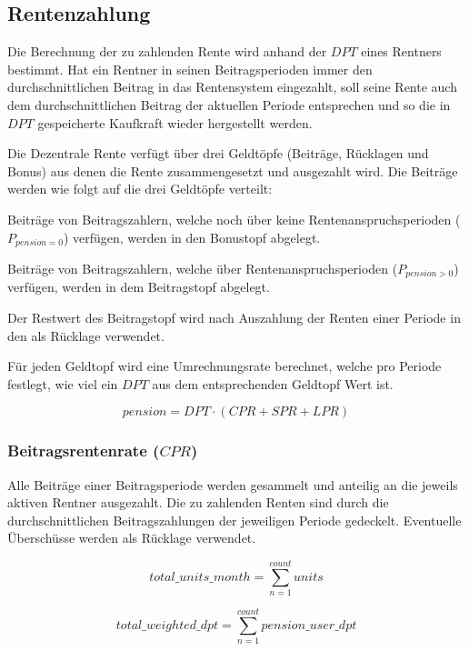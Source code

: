 \subsection{Rentenzahlung}
Die Berechnung der zu zahlenden Rente wird anhand der $DPT$ eines Rentners bestimmt.
Hat ein
Rentner in seinen Beitragsperioden immer den durchschnittlichen Beitrag in das
Rentensystem eingezahlt, soll seine
Rente auch dem durchschnittlichen Beitrag der aktuellen
Periode entsprechen und so die in $DPT$ gespeicherte Kaufkraft wieder hergestellt werden.


Die Dezentrale Rente verfügt über drei Geldtöpfe (Beiträge, Rücklagen und Bonus) 
aus denen die Rente zusammengesetzt und ausgezahlt wird. Die Beiträge werden wie folgt auf 
die drei Geldtöpfe verteilt:
\begin{compactenum}
\item Beiträge von Beitragszahlern, welche noch über keine Rentenanspruchsperioden ($P_{pension = 0}$) verfügen, werden in den Bonustopf abgelegt.
\item Beiträge von Beitragszahlern, welche über Rentenanspruchsperioden ($P_{pension > 0}$) verfügen, werden in dem Beitragstopf abgelegt.
\item Der Restwert des Beitragstopf wird nach Auszahlung der Renten einer Periode in den als Rücklage verwendet.
\end{compactenum}

Für jeden Geldtopf wird eine Umrechnungsrate berechnet, welche pro 
Periode festlegt, wie viel ein $DPT$ aus dem entsprechenden
Geldtopf Wert ist.

\begin{equation}
pension = DPT \cdot (CPR + SPR + LPR)
\end{equation}

\subsubsection*{Beitragsrentenrate ($CPR$)}
Alle Beiträge einer Beitragsperiode werden gesammelt und anteilig an die jeweils
aktiven Rentner ausgezahlt.
Die zu zahlenden Renten sind durch die durchschnittlichen Beitragszahlungen der 
jeweiligen Periode gedeckelt. Eventuelle Überschüsse werden als Rücklage verwendet.

\begin{equation}
	total\_units\_month = 
	\sum_{n=1}^{count} units
\end{equation}

\begin{equation}
	total\_weighted\_dpt = 
	\sum_{n=1}^{count} pension\_user\_dpt
\end{equation}


